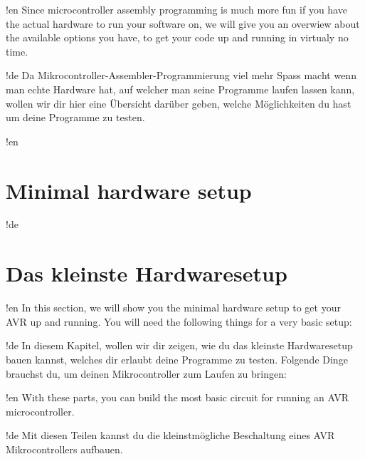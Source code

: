 !en Since microcontroller assembly programming is much more fun if you have the actual hardware to run your software on, we will give you an overwiew about the available options you have, to get your code up and running in virtualy no time.

!de Da Mikrocontroller-Assembler-Programmierung viel mehr Spass macht wenn man echte Hardware hat, auf welcher man seine Programme laufen lassen kann, wollen wir dir hier eine Übersicht darüber geben, welche Möglichkeiten du hast um deine Programme zu testen.

!en \section{Minimal hardware setup}
!de \section{Das kleinste Hardwaresetup}

!en In this section, we will show you the minimal hardware setup to get your AVR up and running. You will need the following things for a very basic setup:

!de In diesem Kapitel, wollen wir dir zeigen, wie du das kleinste Hardwaresetup bauen kannst, welches dir erlaubt deine Programme zu testen. Folgende Dinge brauchst du, um deinen Mikrocontroller zum Laufen zu bringen:


!en With these parts, you can build the most basic circuit for running an AVR microcontroller.

!de Mit diesen Teilen kannst du die kleinstmögliche Beschaltung eines AVR Mikrocontrollers aufbauen.
